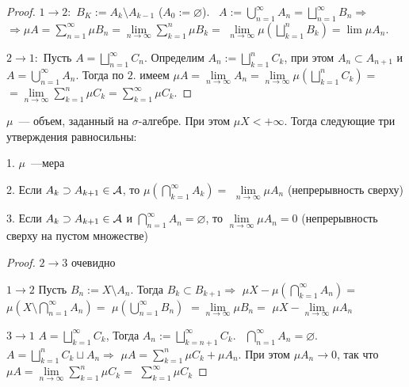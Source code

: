    \begin{proof}
       $1 \to 2:$ $B_K := A_k \setminus A_{k - 1}$ ($A_0 := \varnothing$). \ 
       $A := \bigcup \limits_{n = 1}^{\infty} A_n = \bigsqcup \limits_{n = 1}^{\infty} B_n \Rightarrow$ 
       $\Rightarrow \mu A = \sum \limits_{n=1}^{\infty} \mu B_n = \lim \limits_{n \to \infty} \sum \limits_{k=1}^{n} \mu B_k = $
       $\lim \limits_{n \to \infty} \mu \left ( \bigsqcup \limits_{k = 1}^{n} B_k \right ) = \lim \mu A_n$.
   
       $2 \to 1:$ Пусть $A = \bigsqcup \limits_{n = 1}^{\infty} C_n$. Определим $A_n := \bigsqcup \limits_{k = 1}^{n} C_k$, 
       при этом $A_n \subset A_{n + 1}$ и $A = \bigcup \limits_{n = 1}^{\infty} A_n$. 
       Тогда по $2.$ имеем $\mu A = \lim \limits_{n \to \infty} A_n = \lim \limits_{n \to \infty} \mu (\bigsqcup \limits_{k = 1}^{n} C_k) = $
       \graytext{/*так как $\mu$~--- объем*/}
       $ = \lim \limits_{n \to \infty} \sum \limits_{k=1}^{n} \mu C_k = \sum \limits_{k=1}^{\infty} \mu C_k$.
   \end{proof}
   
   \begin{theorem}
       $\mu$~--- объем, заданный на $\sigma$-алгебре. При этом $\mu X < +\infty$. Тогда следующие три утверждения равносильны:
   
       1. $\mu$~---мера
   
       2. Если $A_k \supset A_{k + 1} \in \mathcal{A}$, то $\mu \left ( \bigcap \limits_{k = 1}^{\infty} A_k \right ) = $
       $\lim \limits_{n \to \infty} \mu A_n$ (непрерывность сверху)
   
       3. Если $A_k \supset A_{k + 1} \in \mathcal{A}$ и $\bigcap \limits_{n = 1}^{\infty} A_n = \varnothing$, то
       $\lim \limits_{n \to \infty} \mu A_n = 0$ (непрерывность сверху на пустом множестве)
   \end{theorem}
   
   \begin{proof}
       $2 \to 3$ очевидно
   
       $1 \to 2$ Пусть $B_n := X \setminus A_n$. Тогда $B_k \subset B_{k + 1} \Rightarrow$
       $\mu X - \mu \left ( \bigcap \limits_{k = 1}^{\infty} A_n \right ) = $
       $\mu \left ( X \setminus \bigcap \limits_{n = 1}^{\infty} A_n  \right ) = $
       $\mu \left ( \bigcup \limits_{n = 1}^{\infty} B_n \right ) $
       $= \lim \limits_{n \to \infty} \mu B_n = $
       $\mu X - \lim \limits_{n \to \infty} \mu A_n$
   
       $3 \to 1$ $A = \bigsqcup \limits_{k = 1}^{\infty} C_k$, Тогда $A_n := \bigsqcup \limits_{k = n + 1}^{\infty} C_k$. \ 
       $\bigcap \limits_{n = 1}^{\infty} A_n = \varnothing$. \ 
       $A = \bigsqcup \limits_{k = 1}^{n} C_k \sqcup A_n \Rightarrow $
       $\mu A = \sum \limits_{k=1}^{n} \mu C_k + \mu A_n$. При этом $\mu A_n \to 0$, так что 
       $\mu A = \lim \limits_{n \to \infty} \sum \limits_{k=1}^{n} \mu C_k = $
       $\sum \limits_{k=1}^{\infty} \mu C_k$
   \end{proof}
   
